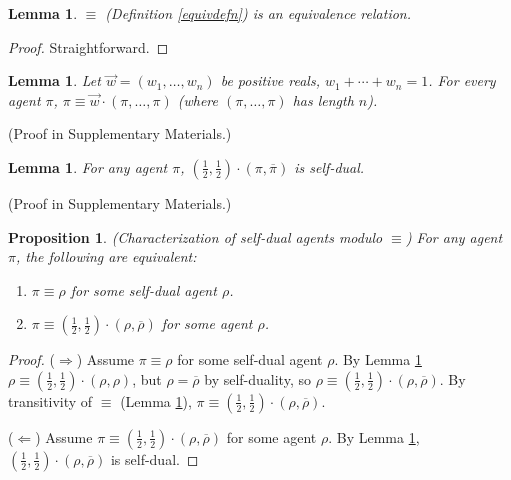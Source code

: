\documentclass[twoside]{article}
\newtheorem{lemma}[theorem]{Lemma}
\newtheorem{proposition}[theorem]{Proposition}
\begin{document}
\begin{lemma}
\label{equivrelationlemma}
    $\equiv$ (Definition \ref{equivdefn}) is an equivalence
    relation.
\end{lemma}

\begin{proof}
    Straightforward.
\end{proof}

\begin{lemma}
\label{piopluspilemma}
    Let $\vec w=(w_1,\ldots,w_n)$ be positive reals,
    $w_1+\cdots+w_n=1$. For every agent $\pi$,
    $\pi\equiv\vec w\cdot (\pi,\ldots,\pi)$ (where
    $(\pi,\ldots,\pi)$ has length $n$).
\end{lemma}
\vspace{-0.5em}(Proof in Supplementary Materials.)


\begin{lemma}
\label{reflectionmakesjanuslemma}
    For any agent $\pi$,
    $(\frac12,\frac12)\cdot(\pi,\overline\pi)$ is self-dual.
\end{lemma}
\vspace{-0.5em}(Proof in Supplementary Materials.)


\begin{proposition}
\label{janusagentcharacterizationproposition}
    (Characterization of self-dual agents modulo $\equiv$)
    For any agent $\pi$, the following are equivalent:
    \begin{enumerate}
        \item $\pi\equiv\rho$ for some self-dual agent $\rho$.
        \item $\pi\equiv(\frac12,\frac12)\cdot(\rho,\overline{\rho})$
            for some agent $\rho$.
    \end{enumerate}
\end{proposition}

\begin{proof}
    ($\Rightarrow$)
    Assume $\pi\equiv\rho$ for some self-dual agent $\rho$.
    By Lemma \ref{piopluspilemma}
    $\rho\equiv (\frac12,\frac12)\cdot(\rho,\rho)$,
    but $\rho=\overline{\rho}$ by self-duality,
    so
    $\rho\equiv (\frac12,\frac12)\cdot(\rho,\overline{\rho})$.
    By transitivity of $\equiv$ (Lemma \ref{equivrelationlemma}),
    $\pi\equiv(\frac12,\frac12)\cdot(\rho,\overline{\rho})$.

    ($\Leftarrow$)
    Assume $\pi\equiv(\frac12,\frac12)\cdot(\rho,\overline{\rho})$ for some agent $\rho$.
    By Lemma \ref{reflectionmakesjanuslemma},
    $(\frac12,\frac12)\cdot(\rho,\overline{\rho})$ is self-dual.
\end{proof}
\end{document}
